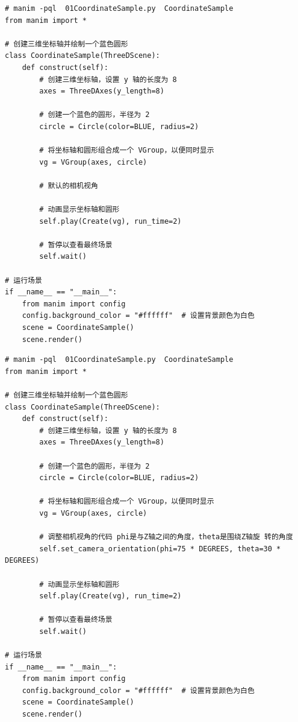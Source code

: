 \begin{lstlisting}[style=pythonstyle]
# manim -pql  01CoordinateSample.py  CoordinateSample
from manim import *

# 创建三维坐标轴并绘制一个蓝色圆形
class CoordinateSample(ThreeDScene):
    def construct(self):
        # 创建三维坐标轴，设置 y 轴的长度为 8
        axes = ThreeDAxes(y_length=8)

        # 创建一个蓝色的圆形，半径为 2
        circle = Circle(color=BLUE, radius=2)

        # 将坐标轴和圆形组合成一个 VGroup，以便同时显示
        vg = VGroup(axes, circle)

        # 默认的相机视角

        # 动画显示坐标轴和圆形
        self.play(Create(vg), run_time=2)

        # 暂停以查看最终场景
        self.wait()

# 运行场景
if __name__ == "__main__":
    from manim import config
    config.background_color = "#ffffff"  # 设置背景颜色为白色
    scene = CoordinateSample()
    scene.render()
\end{lstlisting}    

\begin{lstlisting}[style=pythonstyle]
# manim -pql  01CoordinateSample.py  CoordinateSample
from manim import *

# 创建三维坐标轴并绘制一个蓝色圆形
class CoordinateSample(ThreeDScene):
    def construct(self):
        # 创建三维坐标轴，设置 y 轴的长度为 8
        axes = ThreeDAxes(y_length=8)

        # 创建一个蓝色的圆形，半径为 2
        circle = Circle(color=BLUE, radius=2)

        # 将坐标轴和圆形组合成一个 VGroup，以便同时显示
        vg = VGroup(axes, circle)

        # 调整相机视角的代码 phi是与Z轴之间的角度，theta是围绕Z轴旋 转的角度
        self.set_camera_orientation(phi=75 * DEGREES, theta=30 * DEGREES)

        # 动画显示坐标轴和圆形
        self.play(Create(vg), run_time=2)

        # 暂停以查看最终场景
        self.wait()

# 运行场景
if __name__ == "__main__":
    from manim import config
    config.background_color = "#ffffff"  # 设置背景颜色为白色
    scene = CoordinateSample()
    scene.render()
\end{lstlisting}  


